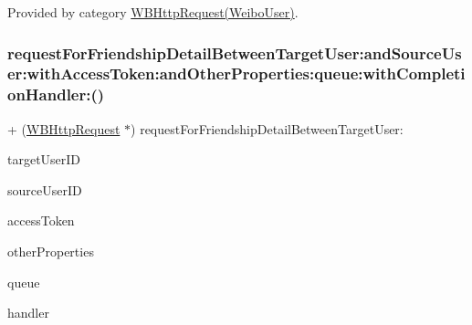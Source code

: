 Provided by category \mbox{\hyperlink{category_w_b_http_request_07_weibo_user_08_a6e438b749b6311301808d7ae0923d7c3}{W\+B\+Http\+Request(\+Weibo\+User)}}.

\mbox{\label{interface_w_b_http_request_a6e438b749b6311301808d7ae0923d7c3}} 
\subsubsection{\texorpdfstring{request\+For\+Friendship\+Detail\+Between\+Target\+User\+:and\+Source\+User\+:with\+Access\+Token\+:and\+Other\+Properties\+:queue\+:with\+Completion\+Handler\+:()}{requestForFriendshipDetailBetweenTargetUser:andSourceUser:withAccessToken:andOtherProperties:queue:withCompletionHandler:()}\hspace{0.1cm}{\footnotesize\ttfamily [2/3]}}
{\footnotesize\ttfamily + (\mbox{\hyperlink{interface_w_b_http_request}{W\+B\+Http\+Request}} $\ast$) request\+For\+Friendship\+Detail\+Between\+Target\+User\+: \begin{DoxyParamCaption}\item[{(N\+S\+String $\ast$)}]{target\+User\+ID }\item[{andSourceUser:(N\+S\+String $\ast$)}]{source\+User\+ID }\item[{withAccessToken:(N\+S\+String $\ast$)}]{access\+Token }\item[{andOtherProperties:(N\+S\+Dictionary $\ast$)}]{other\+Properties }\item[{queue:(N\+S\+Operation\+Queue $\ast$)}]{queue }\item[{withCompletionHandler:(W\+B\+Request\+Handler)}]{handler }\end{DoxyParamCaption}}

